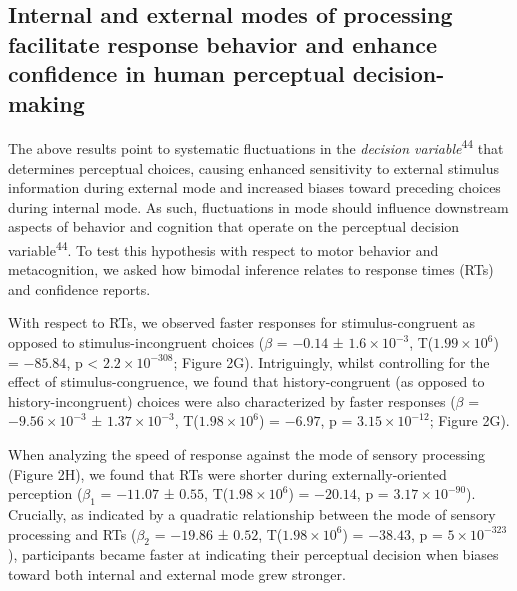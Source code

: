 \documentclass[
]{article}
\begin{document}
\hypertarget{internal-and-external-modes-of-processing-facilitate-response-behavior-and-enhance-confidence-in-human-perceptual-decision-making}{%
\subsection{Internal and external modes of processing facilitate
response behavior and enhance confidence in human perceptual
decision-making}\label{internal-and-external-modes-of-processing-facilitate-response-behavior-and-enhance-confidence-in-human-perceptual-decision-making}}

The above results point to systematic fluctuations in the \emph{decision
variable}\textsuperscript{44} that determines perceptual choices,
causing enhanced sensitivity to external stimulus information during
external mode and increased biases toward preceding choices during
internal mode. As such, fluctuations in mode should influence downstream
aspects of behavior and cognition that operate on the perceptual
decision variable\textsuperscript{44}. To test this hypothesis with
respect to motor behavior and metacognition, we asked how bimodal
inference relates to response times (RTs) and confidence reports.

With respect to RTs, we observed faster responses for stimulus-congruent
as opposed to stimulus-incongruent choices (\(\beta\) = \(-0.14\) ±
\(\ensuremath{1.6\times 10^{-3}}\),
T(\(\ensuremath{1.99\times 10^{6}}\)) = \(-85.84\), p < \(\ensuremath{2.2\times 10^{-308}}\); Figure
2G). Intriguingly, whilst controlling for the effect of
stimulus-congruence, we found that history-congruent (as opposed to
history-incongruent) choices were also characterized by faster responses
(\(\beta\) = \(\ensuremath{-9.56\times 10^{-3}}\) ±
\(\ensuremath{1.37\times 10^{-3}}\),
T(\(\ensuremath{1.98\times 10^{6}}\)) = \(-6.97\), p =
\(\ensuremath{3.15\times 10^{-12}}\); Figure 2G).

When analyzing the speed of response against the mode of sensory
processing (Figure 2H), we found that RTs were shorter during
externally-oriented perception (\(\beta_1\) = \(-11.07\) ± \(0.55\),
T(\(\ensuremath{1.98\times 10^{6}}\)) = \(-20.14\), p =
\(\ensuremath{3.17\times 10^{-90}}\)). Crucially, as indicated by a
quadratic relationship between the mode of sensory processing and RTs
(\(\beta_2\) = \(-19.86\) ± \(0.52\),
T(\(\ensuremath{1.98\times 10^{6}}\)) = \(-38.43\), p =
\(\ensuremath{5\times 10^{-323}}\)), participants became faster at
indicating their perceptual decision when biases toward both internal
and external mode grew stronger.
\end{document}

